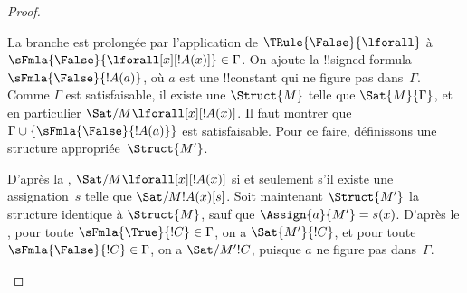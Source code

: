 \documentclass[../../../include/open-logic-section]{subfiles}
\begin{document}
\begin{proof}
\begin{enumerate}
{\item La branche est prolongée par l'application de
  $\TRule{\False}{\lforall}$ à
  $\sFmla{\False}{\lforall[x][!A(x)]} \in \Gamma$. On ajoute la
  !!{signed formula}~$\sFmla{\False}{!A(a)}$, où $a$ est une
  !!{constant} qui ne figure pas dans~$\Gamma$. Comme $\Gamma$ est
  satisfaisable, il existe une $\Struct{M}$ telle que
  $\Sat{M}{\Gamma}$, et en particulier
  $\Sat/{M}{\lforall[x][!A(x)]}$. Il faut montrer que
  $\Gamma \cup \{\sFmla{\False}{!A(a)}\}$ est satisfaisable. Pour ce
  faire, définissons une structure appropriée~$\Struct{M'}$.

  D'après la ,
  $\Sat/{M}{\lforall[x][!A(x)]}$ si et seulement s'il existe une
  assignation~$s$ telle que $\Sat/{M}{!A(x)}[s]$. Soit maintenant
  $\Struct{M'}$ la structure identique à $\Struct{M}$, sauf que
  $\Assign{a}{M'} = s(x)$. D'après le
  , pour toute
  $\sFmla{\True}{!C} \in \Gamma$, on a $\Sat{M'}{!C}$, et pour toute
  $\sFmla{\False}{!C} \in \Gamma$, on a $\Sat/{M'}{!C}$, puisque $a$
  ne figure pas dans~$\Gamma$.

}
\end{enumerate}
\end{proof}
\end{document}
